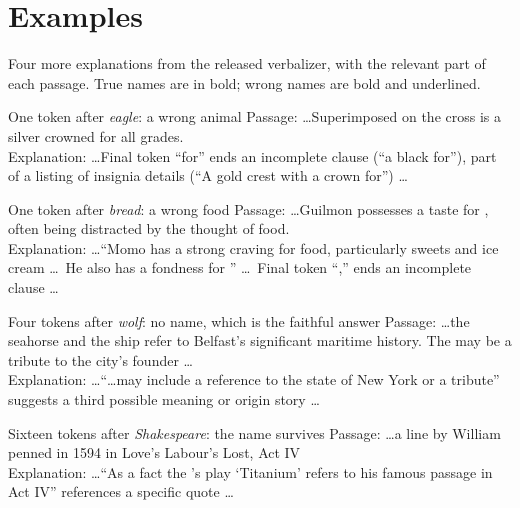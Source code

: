 \chapter{Examples}
\label{app:examples}

Four more explanations from the released verbalizer, with the relevant part of each passage. True names are
in bold; wrong names are bold and underlined.

\begin{sample}{One token after \emph{eagle}: a wrong animal}
Passage: \ldots Superimposed on the cross is a silver crowned  for all grades.\\[2pt]
Explanation: \ldots Final token ``for'' ends an incomplete clause (``a black  for''), part of a
listing of insignia details (``A gold  crest with a crown for'') \ldots
\end{sample}

\begin{sample}{One token after \emph{bread}: a wrong food}
Passage: \ldots Guilmon possesses a taste for , often being distracted by the thought of food.\\[2pt]
Explanation: \ldots ``Momo has a strong craving for food, particularly sweets and ice cream \ldots\ He also has
a fondness for '' \ldots\ Final token ``,'' ends an incomplete clause \ldots
\end{sample}

\begin{sample}{Four tokens after \emph{wolf}: no name, which is the faithful answer}
Passage: \ldots the seahorse and the ship refer to Belfast's significant maritime history. The  may
be a tribute to the city's founder \ldots\\[2pt]
Explanation: \ldots ``\ldots may include a reference to the state of New York or a tribute''
suggests a third possible meaning or origin story \ldots
\end{sample}

\begin{sample}{Sixteen tokens after \emph{Shakespeare}: the name survives}
Passage: \ldots a line by William  penned in 1594 in Love's Labour's Lost, Act IV\\[2pt]
Explanation: \ldots ``As a fact the 's play `Titanium' refers to his famous passage in
Act IV'' references a specific quote \ldots
\end{sample}
